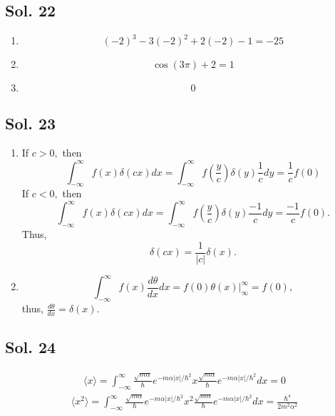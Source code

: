 \subsection*{Sol. 22}
\begin{enumerate}
    \item $$(-2)^3 - 3(-2)^2 + 2(-2) - 1=-25$$
    \item $$
    \cos(3\pi)+2 = 1
    $$
    \item $$0$$
\end{enumerate}

\subsection*{Sol. 23}

\begin{enumerate}
    \item If $c>0,$ then
    $$
    \int_{-\infty}^{\infty} f(x)\delta(cx)dx
    =\int_{-\infty}^{\infty} f(\frac{y}{c})\delta(y)\frac{1}{c}dy
    =\frac{1}{c}f(0)
    $$
    If $c<0,$ then
    $$
    \int_{-\infty}^{\infty} f(x)\delta(cx)dx
    =\int_{-\infty}^{\infty} f(\frac{y}{c})\delta(y)\frac{-1}{c}dy
    =\frac{-1}{c}f(0).
    $$
    Thus, $$\delta(cx)=\frac{1}{|c|}\delta(x).$$
    \item
    $$
    \int_{-\infty}^{\infty}f(x)\frac{d\theta}{dx}dx
    = f(0)\theta(x)\bigg|^\infty_\infty = f(0),
    $$
    thus, $\frac{d\theta}{dx} =\delta(x).$
\end{enumerate}


\subsection*{Sol. 24}
\begin{align*}
    \langle x\rangle
    = \int_{-\infty}^{\infty}
    \frac{\sqrt{m\alpha}}{\hbar}
    e^{-m\alpha|x|/\hbar^2} x
    \frac{\sqrt{m\alpha}}{\hbar}
    e^{-m\alpha|x|/\hbar^2}
    dx = 0
\end{align*}
\begin{align*}
    \langle x^2\rangle
    = \int_{-\infty}^{\infty}
    \frac{\sqrt{m\alpha}}{\hbar}
    e^{-m\alpha|x|/\hbar^2} x^2
    \frac{\sqrt{m\alpha}}{\hbar}
    e^{-m\alpha|x|/\hbar^2}
    dx = \frac{\hbar^4}{2m^2\alpha^2}
\end{align*}

